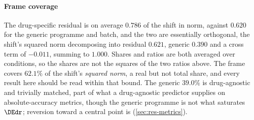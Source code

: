 \paragraph{Frame coverage} The drug-specific residual is on average $0.786$ of
the shift in norm, against $0.620$ for the generic programme and batch, and the
two are essentially orthogonal, the shift's squared norm decomposing into
residual $0.621$, generic $0.390$ and a cross term of $-0.011$, summing to
$1.000$. Shares and ratios are both averaged over conditions, so the shares are
not the squares of the two ratios above. The frame covers
$62.1\%$ of the shift's \emph{squared norm}, a real but not total share, and
every result here should be read within that bound. The generic $39.0\%$ is
drug-agnostic and trivially matched, part of what a drug-agnostic predictor
supplies on absolute-accuracy metrics, though the generic programme is not what
saturates $\DEdr$; reversion toward a central point is (\cref{sec:res-metrics}).

